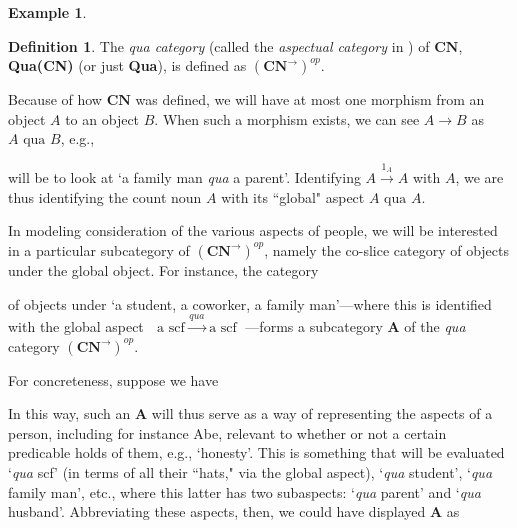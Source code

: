 \documentclass[a4paper]{book}
\theoremstyle{definition}
\newtheorem{example}{Example}[section]
\theoremstyle{definition}
\newtheorem{definition}{Definition}[section]
\theoremstyle{definition}
\theoremstyle{theorem}
\theoremstyle{definition}
\begin{document}
\begin{example}
	\begin{definition}
		The \textit{qua category} (called the \textit{aspectual category} in \cite{la_palme_reyes_models_1999}) of $\textbf{CN}$, \textbf{Qua(CN)} (or just \textbf{Qua}), is defined as $(\textbf{CN}^{\rightarrow})^{op}$. 
	\end{definition}
	Because of how $\textbf{CN}$ was defined, we will have at most one morphism from an object $A$ to an object $B$. When such a morphism exists, we can see $A \rightarrow B$ as $A \text{ qua } B$, e.g., 
	\begin{center} 
	\end{center} 
	will be to look at `a family man \textit{qua} a parent'. Identifying $A \xrightarrow{1_A} A$ with $A$, we are thus identifying the count noun $A$ with its ``global" aspect $A \text{ qua } A$. \par 
	In modeling consideration of the various aspects of people, we will be interested in a particular subcategory of $(\textbf{CN}^{\rightarrow})^{op}$, namely the co-slice category of objects under the global object. For instance, the category 
	\begin{center} 
	\end{center} 
	of objects under `a student, a coworker, a family man'---where this is identified with the global aspect $\boxed{\text{ a scf } } \xrightarrow{qua} \boxed{\text{ a scf }}$---forms a subcategory $\textbf{A}$ of the \textit{qua} category $(\textbf{CN}^{\rightarrow})^{op}$. \par 
	For concreteness, suppose we have 
	\begin{center}
	\end{center}
	In this way, such an $\textbf{A}$ will thus serve as a way of representing the aspects of a person, including for instance Abe, relevant to whether or not a certain predicable holds of them, e.g., `honesty'. This is something that will be evaluated `\textit{qua} scf' (in terms of all their ``hats," via the global aspect), `\textit{qua} student', `\textit{qua} family man', etc., where this latter has two subaspects: `\textit{qua} parent' and `\textit{qua} husband'. Abbreviating these aspects, then, we could have displayed $\textbf{A}$ as 

\end{example}
\end{document}
